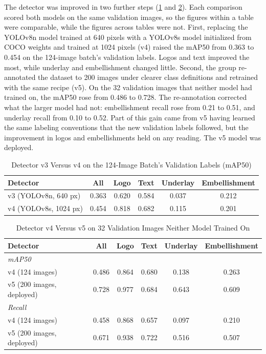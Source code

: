\begin{refsection}
The detector was improved in two further steps (\ref{tab:yolo-v3-v4} and \ref{tab:yolo-v4-v5}). Each comparison scored both models on the same validation images, so the figures within a table were comparable, while the figures across tables were not. First, replacing the YOLOv8n model trained at 640 pixels with a YOLOv8s model initialized from COCO weights and trained at 1024 pixels (v4) raised the mAP50 from 0.363 to 0.454 on the 124-image batch's validation labels. Logos and text improved the most, while underlay and embellishment changed little. Second, the group re-annotated the dataset to 200 images under clearer class definitions and retrained with the same recipe (v5). On the 32 validation images that neither model had trained on, the mAP50 rose from 0.486 to 0.728. The re-annotation corrected what the larger model had not: embellishment recall rose from 0.21 to 0.51, and underlay recall from 0.10 to 0.52. Part of this gain came from v5 having learned the same labeling conventions that the new validation labels followed, but the improvement in logos and embellishments held on any reading. The v5 model was deployed.

\begin{table}[ht]
\centering
\caption{Detector v3 Versus v4 on the 124-Image Batch's Validation Labels (mAP50)}
\label{tab:yolo-v3-v4}
\small
\begin{tabular}{l c c c c c}
\hline
\textbf{Detector} & \textbf{All} & \textbf{Logo} & \textbf{Text} & \textbf{Underlay} & \textbf{Embellishment} \\ \hline
v3 (YOLOv8n, 640 px) & 0.363 & 0.620 & 0.584 & 0.037 & 0.212 \\
v4 (YOLOv8s, 1024 px) & 0.454 & 0.818 & 0.682 & 0.115 & 0.201 \\ \hline
\end{tabular}
\end{table}

\begin{table}[ht]
\centering
\caption{Detector v4 Versus v5 on 32 Validation Images Neither Model Trained On}
\label{tab:yolo-v4-v5}
\small
\begin{tabular}{l c c c c c}
\hline
\textbf{Detector} & \textbf{All} & \textbf{Logo} & \textbf{Text} & \textbf{Underlay} & \textbf{Embellishment} \\ \hline
\multicolumn{6}{l}{\textit{mAP50}} \\
v4 (124 images) & 0.486 & 0.864 & 0.680 & 0.138 & 0.263 \\
v5 (200 images, deployed) & 0.728 & 0.977 & 0.684 & 0.643 & 0.609 \\
\multicolumn{6}{l}{\textit{Recall}} \\
v4 (124 images) & 0.458 & 0.868 & 0.657 & 0.097 & 0.210 \\
v5 (200 images, deployed) & 0.671 & 0.938 & 0.722 & 0.516 & 0.507 \\ \hline
\end{tabular}
\end{table}


\end{refsection}
